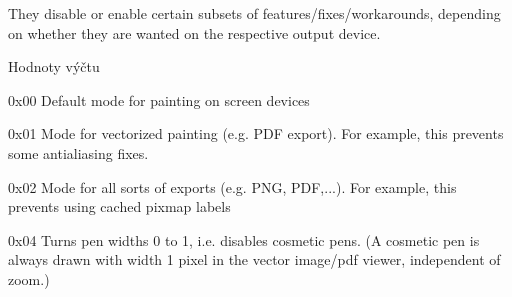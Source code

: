 They disable or enable certain subsets of features/fixes/workarounds, depending on whether they are wanted on the respective output device. \begin{Desc}
\item[Hodnoty výčtu]\par
\begin{description}
\item[{\em 
\hypertarget{classQCPPainter_a156cf16444ff5e0d81a73c615fdb156da3bac5e87e3d58553b297befb4eee2a45}{}pm\+Default\label{classQCPPainter_a156cf16444ff5e0d81a73c615fdb156da3bac5e87e3d58553b297befb4eee2a45}
}]{\ttfamily 0x00} Default mode for painting on screen devices \item[{\em 
\hypertarget{classQCPPainter_a156cf16444ff5e0d81a73c615fdb156daeda679cd55dcd468341d07d48a30b6ab}{}pm\+Vectorized\label{classQCPPainter_a156cf16444ff5e0d81a73c615fdb156daeda679cd55dcd468341d07d48a30b6ab}
}]{\ttfamily 0x01} Mode for vectorized painting (e.\+g. P\+D\+F export). For example, this prevents some antialiasing fixes. \item[{\em 
\hypertarget{classQCPPainter_a156cf16444ff5e0d81a73c615fdb156dae78f9a4eb277a5f9207f50850a51a0b0}{}pm\+No\+Caching\label{classQCPPainter_a156cf16444ff5e0d81a73c615fdb156dae78f9a4eb277a5f9207f50850a51a0b0}
}]{\ttfamily 0x02} Mode for all sorts of exports (e.\+g. P\+N\+G, P\+D\+F,...). For example, this prevents using cached pixmap labels \item[{\em 
\hypertarget{classQCPPainter_a156cf16444ff5e0d81a73c615fdb156dac1e481bfaf408f2bd2eaad3ec341f36b}{}pm\+Non\+Cosmetic\label{classQCPPainter_a156cf16444ff5e0d81a73c615fdb156dac1e481bfaf408f2bd2eaad3ec341f36b}
}]{\ttfamily 0x04} Turns pen widths 0 to 1, i.\+e. disables cosmetic pens. (A cosmetic pen is always drawn with width 1 pixel in the vector image/pdf viewer, independent of zoom.) \end{description}
\end{Desc}


